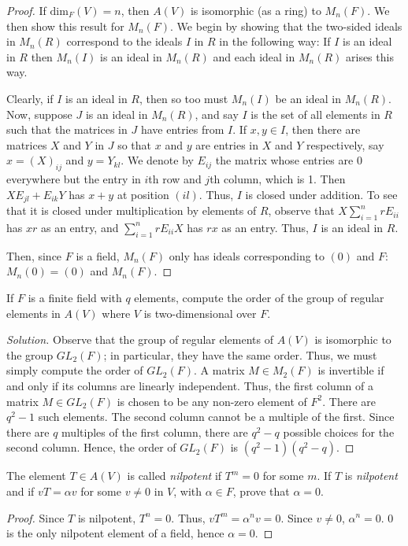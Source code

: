 \documentclass[12pt,leqno]{article}
\numberwithin{equation}{section}
\newcommand{\question}[2] {\vspace{.25in} \noindent\fbox{#1} #2 \vspace{.10in}}
\theoremstyle{definition}
\begin{document}
\begin{proof}
 If $\text{dim}_F(V)=n$, then $A(V)$ is isomorphic (as a ring) to $M_n(F)$. We then show this result for $M_n(F)$. We begin by showing that the two-sided ideals in $M_n(R)$ correspond to the ideals $I$ in $R$ in the following way: If $I$ is an ideal in $R$ then $M_n(I)$ is an ideal in $M_n(R)$ and each ideal in $M_n(R)$ arises this way.

 Clearly, if $I$ is an ideal in $R$, then so too must $M_n(I)$ be an ideal in $M_n(R)$. Now, suppose $J$ is an ideal in $M_n(R)$, and say $I$ is the set of all elements in $R$ such that the matrices in $J$ have entries from $I$. If $x,y\in I$, then there are matrices $X$ and $Y$ in $J$ so that $x$ and $y$ are entries in $X$ and $Y$ respectively, say $x=(X)_{ij}$ and $y=Y_{kl}$. We denote by $E_{ij}$ the matrix whose entries are 0 everywhere but the entry in $i$th row and $j$th column, which is 1. Then $XE_{jl}+E_{ik}Y$ has $x+y$ at position $(il)$. Thus, $I$ is closed under addition. To see that it is closed under multiplication by elements of $R$, observe that $X\sum_{i=1}^nrE_{ii}$ has $xr$ as an entry, and $\sum_{i=1}^nrE_{ii}X$ has $rx$ as an entry. Thus, $I$ is an ideal in $R$.

Then, since $F$ is a field, $M_n(F)$ only has ideals corresponding to $(0)$ and $F$: $M_n(0)=(0)$ and $M_n(F)$.

\end{proof}

\question{14}{If $F$ is a finite field with $q$ elements, compute the order of the group of regular elements in $A(V)$ where $V$ is two-dimensional over $F$.}

\begin{proof}[Solution]
Observe that the group of regular elements of $A(V)$ is isomorphic to the group $GL_2(F)$; in particular, they have the same order. Thus, we must simply compute the order of $GL_2(F)$. A matrix $M\in M_2(F)$ is invertible if and only if its columns are linearly independent. Thus, the first column of a matrix $M\in GL_2(F)$ is chosen to be any non-zero element of $F^2$. There are $q^2-1$ such elements. The second column cannot be a multiple of the first. Since there are $q$ multiples of the first column, there are $q^2-q$ possible choices for the second column. Hence, the order of $GL_2(F)$ is $(q^2-1)(q^2-q)$.
\end{proof}

\question{20}{The element $T\in A(V)$ is called \textit{nilpotent} if $T^m=0$ for some $m$. If $T$ is \textit{nilpotent} and if $vT=\alpha v$ for some $v\not=0$ in $V$, with $\alpha\in F$, prove that $\alpha=0$.}

\begin{proof}
Since $T$ is nilpotent, $T^n=0$. Thus, $vT^m=\alpha^nv=0$. Since $v\not=0$, $\alpha^n=0$. 0 is the only nilpotent element of a field, hence $\alpha=0$.
\end{proof}
\end{document}
